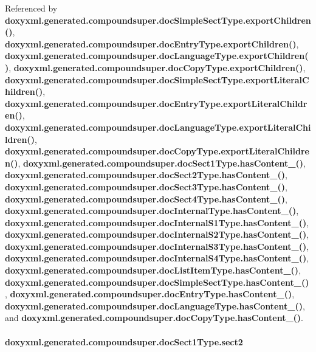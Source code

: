 Referenced by {\bf doxyxml.\+generated.\+compoundsuper.\+doc\+Simple\+Sect\+Type.\+export\+Children()}, {\bf doxyxml.\+generated.\+compoundsuper.\+doc\+Entry\+Type.\+export\+Children()}, {\bf doxyxml.\+generated.\+compoundsuper.\+doc\+Language\+Type.\+export\+Children()}, {\bf doxyxml.\+generated.\+compoundsuper.\+doc\+Copy\+Type.\+export\+Children()}, {\bf doxyxml.\+generated.\+compoundsuper.\+doc\+Simple\+Sect\+Type.\+export\+Literal\+Children()}, {\bf doxyxml.\+generated.\+compoundsuper.\+doc\+Entry\+Type.\+export\+Literal\+Children()}, {\bf doxyxml.\+generated.\+compoundsuper.\+doc\+Language\+Type.\+export\+Literal\+Children()}, {\bf doxyxml.\+generated.\+compoundsuper.\+doc\+Copy\+Type.\+export\+Literal\+Children()}, {\bf doxyxml.\+generated.\+compoundsuper.\+doc\+Sect1\+Type.\+has\+Content\+\_\+()}, {\bf doxyxml.\+generated.\+compoundsuper.\+doc\+Sect2\+Type.\+has\+Content\+\_\+()}, {\bf doxyxml.\+generated.\+compoundsuper.\+doc\+Sect3\+Type.\+has\+Content\+\_\+()}, {\bf doxyxml.\+generated.\+compoundsuper.\+doc\+Sect4\+Type.\+has\+Content\+\_\+()}, {\bf doxyxml.\+generated.\+compoundsuper.\+doc\+Internal\+Type.\+has\+Content\+\_\+()}, {\bf doxyxml.\+generated.\+compoundsuper.\+doc\+Internal\+S1\+Type.\+has\+Content\+\_\+()}, {\bf doxyxml.\+generated.\+compoundsuper.\+doc\+Internal\+S2\+Type.\+has\+Content\+\_\+()}, {\bf doxyxml.\+generated.\+compoundsuper.\+doc\+Internal\+S3\+Type.\+has\+Content\+\_\+()}, {\bf doxyxml.\+generated.\+compoundsuper.\+doc\+Internal\+S4\+Type.\+has\+Content\+\_\+()}, {\bf doxyxml.\+generated.\+compoundsuper.\+doc\+List\+Item\+Type.\+has\+Content\+\_\+()}, {\bf doxyxml.\+generated.\+compoundsuper.\+doc\+Simple\+Sect\+Type.\+has\+Content\+\_\+()}, {\bf doxyxml.\+generated.\+compoundsuper.\+doc\+Entry\+Type.\+has\+Content\+\_\+()}, {\bf doxyxml.\+generated.\+compoundsuper.\+doc\+Language\+Type.\+has\+Content\+\_\+()}, and {\bf doxyxml.\+generated.\+compoundsuper.\+doc\+Copy\+Type.\+has\+Content\+\_\+()}.

\paragraph[{sect2}]{\setlength{\rightskip}{0pt plus 5cm}doxyxml.\+generated.\+compoundsuper.\+doc\+Sect1\+Type.\+sect2}\label{classdoxyxml_1_1generated_1_1compoundsuper_1_1docSect1Type_ac4e11d464151637fdf966f5288fcc6fb}


